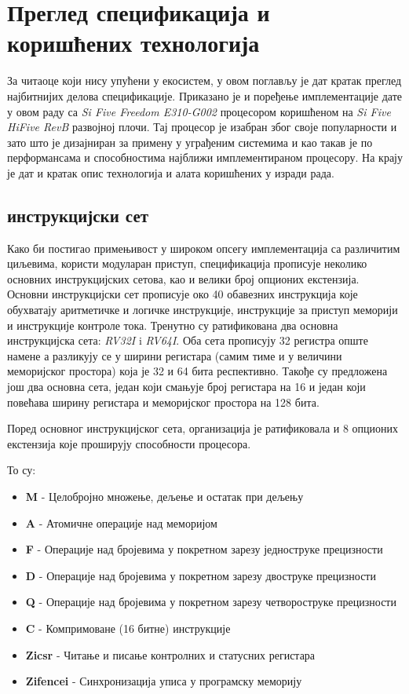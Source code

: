 \chapter{Преглед спецификација и коришћених технологија}

За читаоце који нису упућени у  екосистем, у овом поглављу је дат кратак преглед најбитнијих делова спецификације.
Приказано је и поређење имплементације дате у овом раду са \textit{Si Five Freedom E310-G002} процесором коришћеном на \textit{Si Five HiFive RevB}\cite{hifive_site} развојној плочи.
Тај процесор је изабран због своје популарности и зато што је дизајниран за примену у уграђеним системима и као такав је по перформансама и способностима најближи имплементираном процесору.
На крају је дат и кратак опис технологија и алата коришћених у изради рада.

\section{ инструкцијски сет}

Како би постигао примењивост у широком опсегу имплементација са различитим циљевима,  користи модуларан приступ, спецификација\cite{riscv_spec} прописује неколико основних инструкцијских сетова, као и велики број опционих екстензија.
Основни инструкцијски сет прописује око 40 обавезних инструкција које обухватају аритметичке и логичке инструкције, инструкције за приступ меморији и инструкције контроле тока.
Тренутно су ратификована два основна инструкцијска сета: \textit{RV32I} i \textit{RV64I}. Оба сета прописују 32 регистра опште намене а разликују се у ширини регистара (самим тиме и у величини меморијског простора) која је 32 и 64 бита респективно. Такође су предложена још два основна сета, један који смањује број регистара на 16 и један који повећава ширину регистара и меморијског простора на 128 бита.

Поред основног инструкцијског сета,  организација је ратификовала и 8 опционих екстензија које проширују способности процесора.

То су:
\begin{itemize}
	\item \textbf{M} - Целобројно множење, дељење и остатак при дељењу
	\item \textbf{A} - Атомичне операције над меморијом
	\item \textbf{F} - Операције над бројевима у покретном зарезу једноструке прецизности
	\item \textbf{D} - Операције над бројевима у покретном зарезу двоструке прецизности
	\item \textbf{Q} - Операције над бројевима у покретном зарезу четвороструке прецизности
	\item \textbf{C} - Компримоване (16 битне) инструкције
	\item \textbf{Zicsr} - Читање и писање контролних и статусних регистара
	\item \textbf{Zifencei} - Синхронизација уписа у програмску меморију
\end{itemize}

